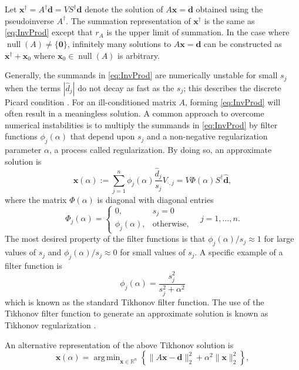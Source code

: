 \documentclass[12pt]{article}
\newcommand{\rA}{r_A}	%
\newcommand{\dVec}{\mathbf{d}}	%
\newcommand{\xVec}{\mathbf{x}}	%
\newcommand{\pinv}[1]{{#1}^\dagger}	%
\DeclareMathOperator{\nullspace}{null}	%
\newcommand{\regparam}{\alpha}  %
\DeclareMathOperator*{\argmin}{arg\,min}
\newcommand{\filt}{\phi}
\newcommand{\zeroVec}{\bm{0}}	%
\newcommand{\singular}{s}	%
\newcommand{\svd}[1]{\widehat{#1}}	%
\begin{document}
Let $\pinv{\xVec} = \pinv{A}\dVec = V\pinv{S}\svd{\dVec}$ denote the solution of $A\xVec = \dVec$ obtained using the pseudoinverse $\pinv{A}$. The summation representation of $\pinv{\xVec}$ is the same as \eqref{eq:InvProd} except that $\rA$ is the upper limit of summation. In the case where $\nullspace(A) \neq \{\zeroVec\}$, infinitely many solutions to $A\xVec = \dVec$ can be constructed as $\pinv{\xVec} + \xVec_0$ where $\xVec_0 \in \nullspace(A)$ is arbitrary. \par
Generally, the summands in \eqref{eq:InvProd} are numerically unstable for small $\singular_j$ when the terms $\left|\svd{d}_j\right|$ do not decay as fast as the $\singular_j$; this describes the discrete Picard condition \cite{Hansen:98}. For an ill-conditioned matrix $A$, forming \eqref{eq:InvProd} will often result in a meaningless solution. A common approach to overcome numerical instabilities is to multiply the summands in \eqref{eq:InvProd} by filter functions $\filt_j(\regparam)$ that depend upon $\singular_j$ and a non-negative regularization parameter $\regparam$, a process called regularization. By doing so, an approximate solution is
\begin{equation}
\label{eq:ApproxSol}
\xVec(\regparam) := \sum_{j=1}^{n} \filt_j(\regparam) \frac{\svd{d}_j}{\singular_j}V_{\cdot,j}  = V\Phi(\regparam){S}^\dagger\svd{\dVec},
\end{equation}
where the matrix $\Phi(\regparam)$ is diagonal with diagonal entries 
\[\Phi_j(\regparam) = \begin{cases}
0, & \singular_j = 0 \\
\filt_j(\regparam), & \text{otherwise,}
\end{cases} \quad j = 1,\ldots,n.\]
The most desired property of the filter functions is that $\filt_j(\regparam)/\singular_j \approx 1$  for large values of $\singular_j$ and $\filt_j(\regparam)/\singular_j \approx 0$ for small values of $\singular_j$. A specific example of a filter function is
\begin{equation}
\label{eq:TikFilt}
\filt_j(\regparam)  = \frac{\singular_j^2}{\singular_j^2 + \regparam^2}
\end{equation}
which is known as the standard Tikhonov filter function. The use of the Tikhonov filter function to generate an approximate solution is known as Tikhonov regularization \cite{Tikh1963}. \par
An alternative representation of the above Tikhonov solution is
\begin{equation}
\label{eq:Damped LS}
\xVec(\regparam) = \argmin_{\xVec \in \mathbb{R}^n} \left\{\|A\xVec - \dVec\|_2^2 + \regparam^2\|\xVec\|_2^2\right\},
\end{equation}
\end{document}
